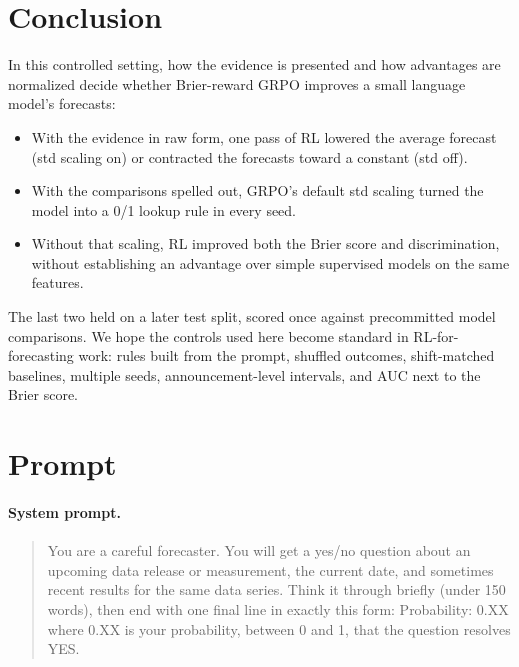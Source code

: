 \documentclass[11pt]{article}
\begin{document}
\section{Conclusion}

In this controlled setting, how the evidence is presented and how advantages are normalized decide whether Brier-reward GRPO improves a small language model's forecasts:
\begin{itemize}[leftmargin=*]
\item With the evidence in raw form, one pass of RL lowered the average forecast (std scaling on) or contracted the forecasts toward a constant (std off).
\item With the comparisons spelled out, GRPO's default std scaling turned the model into a 0/1 lookup rule in every seed.
\item Without that scaling, RL improved both the Brier score and discrimination, without establishing an advantage over simple supervised models on the same features.
\end{itemize}
The last two held on a later test split, scored once against precommitted model comparisons.
We hope the controls used here become standard in RL-for-forecasting work: rules built from the prompt, shuffled outcomes, shift-matched baselines, multiple seeds, announcement-level intervals, and AUC next to the Brier score.




\clearpage
\appendix

\section{Prompt}
\label{app:prompt}

\paragraph{System prompt.}
\begin{quote}\small
You are a careful forecaster. You will get a yes/no question about an upcoming data release or measurement, the current date, and sometimes recent results for the same data series. Think it through briefly (under 150 words), then end with one final line in exactly this form: Probability: 0.XX where 0.XX is your probability, between 0 and 1, that the question resolves YES.
\end{quote}
\end{document}
